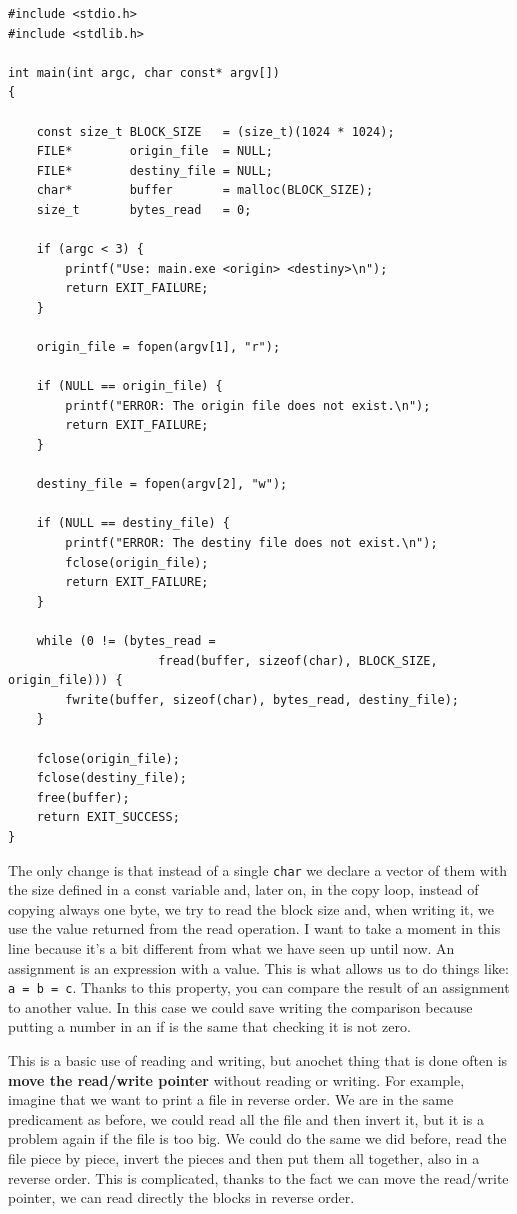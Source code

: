 \documentclass[a4paper]{article}
\begin{document}
\noindent
\begin{minipage}[H]{\linewidth}
\mbox{}
\begin{lstlisting}[style=C,
caption={Example of file copying with a buffer},
label={lst:readWithBuffer}]
#include <stdio.h>
#include <stdlib.h>

int main(int argc, char const* argv[])
{

    const size_t BLOCK_SIZE   = (size_t)(1024 * 1024);
    FILE*        origin_file  = NULL;
    FILE*        destiny_file = NULL;
    char*        buffer       = malloc(BLOCK_SIZE);
    size_t       bytes_read   = 0;

    if (argc < 3) {
        printf("Use: main.exe <origin> <destiny>\n");
        return EXIT_FAILURE;
    }

    origin_file = fopen(argv[1], "r");

    if (NULL == origin_file) {
        printf("ERROR: The origin file does not exist.\n");
        return EXIT_FAILURE;
    }

    destiny_file = fopen(argv[2], "w");

    if (NULL == destiny_file) {
        printf("ERROR: The destiny file does not exist.\n");
        fclose(origin_file);
        return EXIT_FAILURE;
    }

    while (0 != (bytes_read =
                     fread(buffer, sizeof(char), BLOCK_SIZE, origin_file))) {
        fwrite(buffer, sizeof(char), bytes_read, destiny_file);
    }

    fclose(origin_file);
    fclose(destiny_file);
    free(buffer);
    return EXIT_SUCCESS;
}
\end{lstlisting}
\end{minipage}

The only change is that instead of a single \verb!char! we declare a vector of
them with the size defined in a const variable and, later on, in the copy loop,
instead of copying always one byte, we try to read the block size and, when
writing it, we use the value returned from the read operation. I want to take a
moment in this line because it's a bit different from what we have seen up until
now. An assignment is an expression with a value. This is what allows us to do
things like: \verb!a = b = c!. Thanks to this property, you can compare the
result of an assignment to another value. In this case we could save writing the
comparison because putting a number in an if is the same that checking it is not
zero.

This is a basic use of reading and writing, but anochet thing that is done often
is \textbf{move the read/write pointer} without reading or writing. For example,
imagine that we want to print a file in reverse order. We are in the same
predicament as before, we could read all the file and then invert it, but it is
a problem again if the file is too big. We could do the same we did before, read
the file piece by piece, invert the pieces and then put them all together, also
in a reverse order. This is complicated, thanks to the fact we can move the
read/write pointer, we can read directly the blocks in reverse order.
\end{document}
